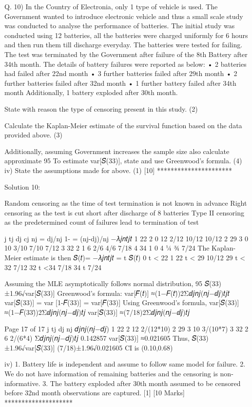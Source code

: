 Q. 10)
In the Country of Electronia, only 1 type of vehicle is used. The Government wanted to introduce electronic vehicle and thus a small scale study was conducted to analyse the performance of batteries. The initial study was conducted using 12 batteries, all the batteries were charged uniformly for 6 hours and then run them till discharge everyday. The batteries were tested for failing. The test was terminated by the Government after failure of the 8th Battery after 34th month. The details of battery failures were reported as below:
• 2 batteries had failed after 22nd month
• 3 further batteries failed after 29th month
• 2 further batteries failed after 32nd month
• 1 further battery failed after 34th month
Additionally, 1 battery exploded after 30th month.
\item State with reason the type of censoring present in this study.
(2)
\item Calculate the Kaplan-Meier estimate of the survival function based on the data provided above.
(3)
\item Additionally, assuming Government increases the sample size also calculate approximate 95%
To estimate var[𝑆̃(33)], state and use Greenwood’s formula.
(4)
iv) State the assumptions made for above.
(1)
[10]
**********************

Solution 10:
\item
Random censoring as the time of test termination is not known in advance
Right censoring as the test is cut short after discharge of 8 batteries
Type II censoring as the predetermined count of failures lead to termination of test

\item
j
tj
dj
cj
nj
\lambdaj = dj/nj
1- \lambdaj = (nj-dj)/nj
−𝜆𝑗𝑛𝑡𝑗\leq 𝑡
1
22
2
0
12
2/12
10/12
10/12
2
29
3
0
10
3/10
7/10
7/12
3
32
2
1
6
2/6
4/6
7/18
4
34
1
0
4
¼
¾
7/24
The Kaplan-Meier estimate is then
𝑆̂(𝑡)= −𝜆𝑗𝑛𝑡𝑗\leq 𝑡 =
t 𝑆̂(𝑡)
0 \leq  t < 22 1
22 \leq  t < 29 10/12
29 \leq  t < 32 7/12
32 \leq  t <34 7/18
34 \leq  t 7/24

\item
Assuming the MLE asymptotically follows normal distribution, 95%
𝑆̃(33)±1.96√var[𝑆̃(33)]
Greenwood’s formula:
var[𝐹̃(𝑡)] ≈(1−𝐹(𝑡)̂)2Σⅆ𝑗𝑛𝑗(𝑛𝑗−ⅆ𝑗)𝑡𝑗\leq 𝑡
var[𝑆̃(33)] = var [1-𝐹̃(33)] = var[𝐹̃(33)]
Using Greenwood’s formula,
var[𝑆̃(33)] ≈(1−𝐹(33)̂)2Σⅆ𝑗𝑛𝑗(𝑛𝑗−ⅆ𝑗)𝑡𝑗
var[𝑆̃(33)] ≈(7/18)2Σⅆ𝑗𝑛𝑗(𝑛𝑗−ⅆ𝑗)𝑡𝑗

Page 17 of 17
j
tj
dj
nj
𝑑𝑗𝑛𝑗(𝑛𝑗−𝑑𝑗)
1
22
2
12
2/(12*10)
2
29
3
10
3/(10*7)
3
32
2
6
2/(6*4)
Σ𝑑𝑗𝑛𝑗(𝑛𝑗−𝑑𝑗)𝑡𝑗
0.142857
var[𝑆̃(33)] ≈0.021605
Thus, 𝑆̃(33)±1.96√var[𝑆̃(33)]
(7/18)±1.96√0.021605
CI is (0.10,0.68)

iv)
1. Battery life is independent and assume to follow same model for failure.
2. We do not have information of remaining batteries and the censoring is non-informative.
3. The battery exploded after 30th month assumed to be censored before 32nd month observations are captured.
[1]
[10 Marks]
********************